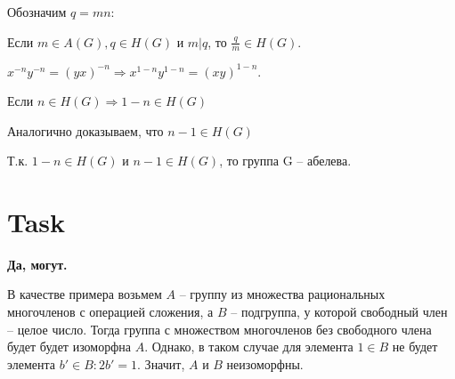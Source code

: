 \documentclass[12pt, a4paper]{article}
\theoremstyle{definition}
\begin{document}
    Обозначим $q = mn$:

    Если $m \in A(G), q \in H(G)$ и $m | q$, то $\frac{q}{m} \in H(G)$.

    $x^{-n}y^{-n} = (yx)^{-n} \Rightarrow x^{1-n}y^{1-n} = (xy)^{1-n}.$

    Если $n \in H(G) \Rightarrow 1 - n \in H(G)$

    Аналогично доказываем, что $n - 1 \in H(G)$

    Т.к. $1 - n \in H(G)$ и $n - 1 \in H(G)$, то группа G -- абелева.

\section{Task}

    \textbf{Да, могут.}

    В качестве примера возьмем $A$ -- группу из множества рациональных многочленов с операцией сложения, а $B$ -- подгруппа,
    у которой свободный член -- целое число. Тогда группа с множеством многочленов без свободного члена будет будет изоморфна $A$.
    Однако, в таком случае для элемента $1 \in B$ не будет элемента $b' \in B : 2b' = 1$. Значит, $A$ и $B$ неизоморфны.
    
\end{document}
